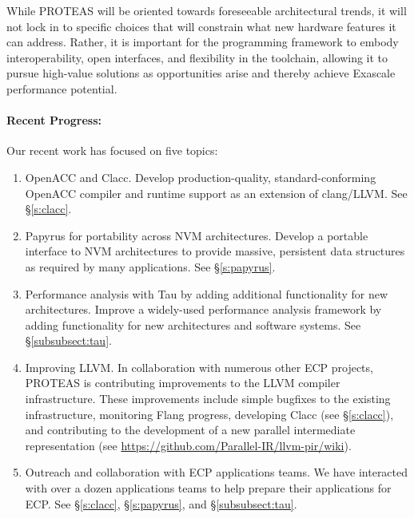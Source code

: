 While PROTEAS will be oriented towards foreseeable architectural trends, it will not lock in to specific choices that will constrain what new hardware features it can address. Rather, it is important for the programming framework to embody interoperability, open interfaces, and flexibility in the toolchain, allowing it to pursue high-value solutions as opportunities arise and thereby achieve Exascale performance potential. 

\paragraph{Recent Progress:}

Our recent work has focused on five topics:

\begin{enumerate}
    
    \item OpenACC and Clacc. Develop production-quality, standard-conforming OpenACC compiler and runtime support as an extension of clang/LLVM. See \S\ref{s:clacc}.
    
    \item Papyrus for portability across NVM architectures. 
    Develop a portable interface to NVM architectures to provide massive, persistent data structures as required by many applications.
    See \S\ref{s:papyrus}.
    
    \item Performance analysis with Tau by adding additional functionality for new architectures. 
    Improve a widely-used performance analysis framework by adding functionality for new architectures and software systems.
    See \S\ref{subsubsect:tau}.

    \item Improving LLVM. In collaboration with numerous other ECP projects, PROTEAS is contributing improvements to the LLVM compiler infrastructure. These improvements include simple bugfixes to the existing infrastructure, monitoring Flang progress, developing Clacc (see \S\ref{s:clacc}), and contributing to the development of a new parallel intermediate representation (see \url{https://github.com/Parallel-IR/llvm-pir/wiki}).
    
    \item Outreach and collaboration with ECP applications teams. 
    We have interacted with over a dozen applications teams to help prepare their applications for ECP. See \S\ref{s:clacc}, \S\ref{s:papyrus}, and \S\ref{subsubsect:tau}.
    
\end{enumerate}

